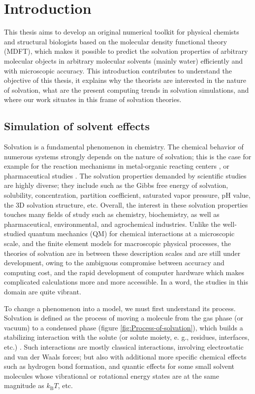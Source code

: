 
\chapter{Introduction\label{chpt:introduction}}

This thesis aims to develop an original numerical toolkit for physical
chemists and structural biologists based on the molecular density
functional theory (\acs{MDFT}), which makes it possible to predict
the solvation properties of arbitrary molecular objects in arbitrary
molecular solvents (mainly water) efficiently and with microscopic
accuracy. This introduction contributes to understand the objective
of this thesis, it explains why the theorists are interested in the
nature of solvation, what are the present computing trends in solvation
simulations, and where our work situates in this frame of solvation
theories.


\section{Simulation of solvent effects}

Solvation is a fundamental phenomenon in chemistry. The chemical behavior
of numerous systems strongly depends on the nature of solvation; this
is the case for example for the reaction mechanisms in metal-organic
reacting centers \citep{Mn-oxo,PCET}, or pharmaceutical studies \citep{drug_1_Perlovich,drug_2_Perlovich,drug_3}.
The solvation properties demanded by scientific studies are highly
diverse; they include such as the Gibbs free energy of solvation,
solubility, concentration, partition coefficient, saturated vapor
pressure, pH value, the 3D solvation structure, etc. Overall, the
interest in these solvation properties touches many fields of study
such as chemistry, biochemistry, as well as pharmaceutical, environmental,
and agrochemical industries. Unlike the well-studied quantum mechanics
(\acs{QM}) for chemical interactions at a microscopic scale, and
the finite element models for macroscopic physical processes, the
theories of solvation are in between these description scales and
are still under development, owing to the ambiguous compromise between
accuracy and computing cost, and the rapid development of computer
hardware which makes complicated calculations more and more accessible.
In a word, the studies in this domain are quite vibrant.

To change a phenomenon into a model, we must first understand its
process. Solvation is defined as the process of moving a molecule
from the gas phase (or vacuum) to a condensed phase (figure \ref{fig:Process-of-solvation}),
which builds a stabilizing interaction with the solute (or solute
moiety, e. g., residues, interfaces, etc.) \citep{iupac}. Such interactions
are mostly classical interactions, involving electrostatic and van
der Waals forces; but also with additional more specific chemical
effects such as hydrogen bond formation, and quantic effects for some
small solvent molecules whose vibrational or rotational energy states
are at the same magnitude as $k_{\mathrm{B}}T$, etc.

